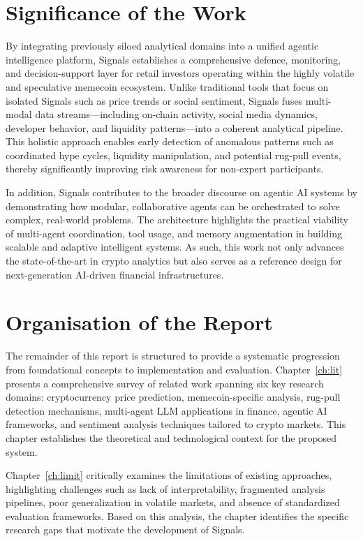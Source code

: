 \documentclass[12pt,a4paper,oneside,openany]{book}
\begin{document}
\section{Significance of the Work}
By integrating previously siloed analytical domains into a unified agentic intelligence platform, Signals establishes a comprehensive defence, monitoring, and decision-support layer for retail investors operating within the highly volatile and speculative memecoin ecosystem. Unlike traditional tools that focus on isolated Signals such as price trends or social sentiment, Signals fuses multi-modal data streams—including on-chain activity, social media dynamics, developer behavior, and liquidity patterns—into a coherent analytical pipeline. This holistic approach enables early detection of anomalous patterns such as coordinated hype cycles, liquidity manipulation, and potential rug-pull events, thereby significantly improving risk awareness for non-expert participants.

In addition, Signals contributes to the broader discourse on agentic AI systems by demonstrating how modular, collaborative agents can be orchestrated to solve complex, real-world problems. The architecture highlights the practical viability of multi-agent coordination, tool usage, and memory augmentation in building scalable and adaptive intelligent systems. As such, this work not only advances the state-of-the-art in crypto analytics but also serves as a reference design for next-generation AI-driven financial infrastructures.

\section{Organisation of the Report}
The remainder of this report is structured to provide a systematic progression from foundational concepts to implementation and evaluation. Chapter~\ref{ch:lit} presents a comprehensive survey of related work spanning six key research domains: cryptocurrency price prediction, memecoin-specific analysis, rug-pull detection mechanisms, multi-agent LLM applications in finance, agentic AI frameworks, and sentiment analysis techniques tailored to crypto markets. This chapter establishes the theoretical and technological context for the proposed system.

Chapter~\ref{ch:limit} critically examines the limitations of existing approaches, highlighting challenges such as lack of interpretability, fragmented analysis pipelines, poor generalization in volatile markets, and absence of standardized evaluation frameworks. Based on this analysis, the chapter identifies the specific research gaps that motivate the development of Signals.
\end{document}
